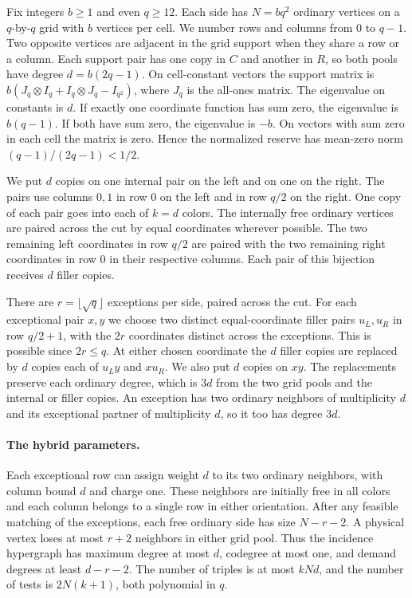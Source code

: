 Fix integers \(b\ge1\) and even \(q\ge12\). Each side has \(N=bq^2\) ordinary vertices on a \(q\)-by-\(q\) grid with \(b\) vertices per cell. We number rows and columns from \(0\) to \(q-1\). Two opposite vertices are adjacent in the grid support when they share a row or a column. Each support pair has one copy in \(C\) and another in \(R\), so both pools have degree \(d=b(2q-1)\). On cell-constant vectors the support matrix is \(b(J_q\otimes I_q+I_q\otimes J_q-I_{q^2})\), where \(J_q\) is the all-ones matrix. The eigenvalue on constants is \(d\). If exactly one coordinate function has sum zero, the eigenvalue is \(b(q-1)\). If both have sum zero, the eigenvalue is \(-b\). On vectors with sum zero in each cell the matrix is zero. Hence the normalized reserve has mean-zero norm \((q-1)/(2q-1)<1/2\).

We put \(d\) copies on one internal pair on the left and on one on the right. The pairs use columns \(0,1\) in row \(0\) on the left and in row \(q/2\) on the right. One copy of each pair goes into each of \(k=d\) colors. The internally free ordinary vertices are paired across the cut by equal coordinates wherever possible. The two remaining left coordinates in row \(q/2\) are paired with the two remaining right coordinates in row \(0\) in their respective columns. Each pair of this bijection receives \(d\) filler copies.

There are \(r=\lfloor\sqrt q\rfloor\) exceptions per side, paired across the cut. For each exceptional pair \(x,y\) we choose two distinct equal-coordinate filler pairs \(u_L,u_R\) in row \(q/2+1\), with the \(2r\) coordinates distinct across the exceptions. This is possible since \(2r\le q\). At either chosen coordinate the \(d\) filler copies are replaced by \(d\) copies each of \(u_Ly\) and \(xu_R\). We also put \(d\) copies on \(xy\). The replacements preserve each ordinary degree, which is \(3d\) from the two grid pools and the internal or filler copies. An exception has two ordinary neighbors of multiplicity \(d\) and its exceptional partner of multiplicity \(d\), so it too has degree \(3d\).

\paragraph{The hybrid parameters.}
Each exceptional row can assign weight \(d\) to its two ordinary neighbors, with column bound \(d\) and charge one. These neighbors are initially free in all colors and each column belongs to a single row in either orientation. After any feasible matching of the exceptions, each free ordinary side has size \(N-r-2\). A physical vertex loses at most \(r+2\) neighbors in either grid pool. Thus the incidence hypergraph has maximum degree at most \(d\), codegree at most one, and demand degrees at least \(d-r-2\). The number of triples is at most \(kNd\), and the number of tests is \(2N(k+1)\), both polynomial in \(q\).

